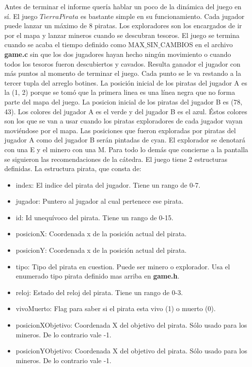 Antes de terminar el informe quería hablar un poco de la dinámica del juego en sí.
El juego $Tierra Pirata$ es bastante simple en su funcionamiento. Cada jugador puede lanzar un máximo de 8 piratas. Los exploradores son los encargados de ir por el mapa y lanzar mineros cuando se descubran tesoros. El juego se termina cuando se acaba el tiempo definido como MAX$\_$SIN$\_$CAMBIOS en el archivo \textbf{game.c} sin que los dos jugadores hayan hecho ningún movimiento o cuando todos los tesoros fueron descubiertos y cavados. Resulta ganador el jugador con más puntos al momento de terminar el juego. Cada punto se le va restando a la tercer tupla del arreglo botines.
La posición inicial de los piratas del jugador A es la (1, 2) porque se tomó que la primera linea es una línea negra que no forma parte del mapa del juego. La posicion inicial de los piratas del jugador B es (78, 43). Los colores del jugador A es el verde y del jugador B es el azul. Éstos colores son los que se van a usar cuando los piratas exploradores de cada jugador vayan moviéndose por el mapa. Las posiciones que fueron exploradas por piratas del jugador A como del jugador B serán pintadas de cyan. El explorador se denotará con una E y el minero con una M. Para todo lo demás que concierne a la pantalla se siguieron las recomendaciones de la cátedra.
\newline
\newline
El juego tiene 2 estructuras definidas.
La estructura pirata, que consta de: 
\begin{itemize}
\item index: El indice del pirata del jugador. Tiene un rango de 0-7.
\item jugador: Puntero al jugador al cual pertenece ese pirata.
\item id: Id unequívoco del pirata. Tiene un rango de 0-15.
\item posicionX: Coordenada x de la posición actual del pirata. 
\item posicionY: Coordenada x de la posición actual del pirata. 
\item tipo: Tipo del pirata en cuestion. Puede ser minero o explorador. Usa el enumerado tipo pirata definido mas arriba en \textbf{game.h}.
\item reloj: Estado del reloj del pirata. Tiene un rango de 0-3.
\item vivoMuerto: Flag para saber si el pirata esta vivo (1) o muerto (0).
\item posicionXObjetivo: Coordenada X del objetivo del pirata. Sólo usado para los mineros. De lo contrario vale -1.
\item posicionYObjetivo: Coordenada X del objetivo del pirata. Sólo usado para los mineros. De lo contrario vale -1.
\end{itemize}
